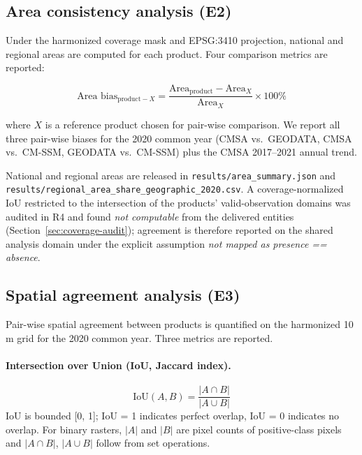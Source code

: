 \documentclass[11pt]{article}
\begin{document}
\subsection{Area consistency analysis (E2)}

Under the harmonized coverage mask and EPSG:3410 projection, national and
regional areas are computed for each product. Four comparison metrics are
reported:

\begin{equation}
\text{Area bias}_{\text{product}-X} =
\frac{\text{Area}_{\text{product}} - \text{Area}_X}{\text{Area}_X} \times 100\%
\label{eq:bias}
\end{equation}

where $X$ is a reference product chosen for pair-wise comparison. We report
all three pair-wise biases for the 2020 common year (CMSA vs.\ GEODATA, CMSA vs.\
CM-SSM, GEODATA vs.\ CM-SSM) plus the CMSA 2017--2021 annual trend.

National and regional areas are released in \texttt{results/area\_summary.json}
and \texttt{results/regional\_area\_share\_geographic\_2020.csv}. A
coverage-normalized IoU restricted to the intersection of the products'
valid-observation domains was audited in R4 and found \emph{not computable}
from the delivered entities (Section~\ref{sec:coverage-audit}); agreement is
therefore reported on the shared analysis domain under the explicit
assumption \emph{not mapped as presence == absence}.

\subsection{Spatial agreement analysis (E3)}

Pair-wise spatial agreement between products is quantified on the harmonized
10\,m grid for the 2020 common year. Three metrics are reported.

\paragraph{Intersection over Union (IoU, Jaccard index).}
\begin{equation}
\text{IoU}(A, B) = \frac{|A \cap B|}{|A \cup B|}
\label{eq:iou}
\end{equation}
IoU is bounded [0, 1]; IoU = 1 indicates perfect overlap, IoU = 0 indicates no
overlap. For binary rasters, $|A|$ and $|B|$ are pixel counts of positive-class
pixels and $|A \cap B|$, $|A \cup B|$ follow from set operations.
\end{document}
